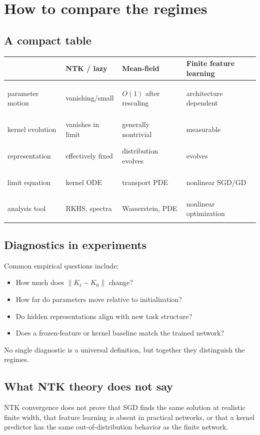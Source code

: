 \documentclass[11pt,a4paper,oneside,openany]{memoir}
\theoremstyle{definition}
\begin{document}
\chapter{How to compare the regimes}
\section{A compact table}
\begin{center}\small
\begin{tabularx}{\textwidth}{>{\bfseries\raggedright\arraybackslash}p{}XXX}
\toprule
 & NTK / lazy & Mean-field & Finite feature learning\\
\midrule
parameter motion & vanishing/small & $O(1)$ after rescaling & architecture dependent\\
kernel evolution & vanishes in limit & generally nontrivial & measurable\\
representation & effectively fixed & distribution evolves & evolves\\
limit equation & kernel ODE & transport PDE & nonlinear SGD/GD\\
analysis tool & RKHS, spectra & Wasserstein, PDE & nonlinear optimization\\
\bottomrule
\end{tabularx}
\end{center}

\section{Diagnostics in experiments}
Common empirical questions include:
\begin{itemize}
\item How much does $\|K_t-K_0\|$ change?
\item How far do parameters move relative to initialization?
\item Do hidden representations align with new task structure?
\item Does a frozen-feature or kernel baseline match the trained network?
\end{itemize}
No single diagnostic is a universal definition, but together they distinguish the regimes.

\section{What NTK theory does not say}
NTK convergence does not prove that SGD finds the same solution at realistic finite width, that feature learning is absent in practical networks, or that a kernel predictor has the same out-of-distribution behavior as the finite network.
\end{document}
